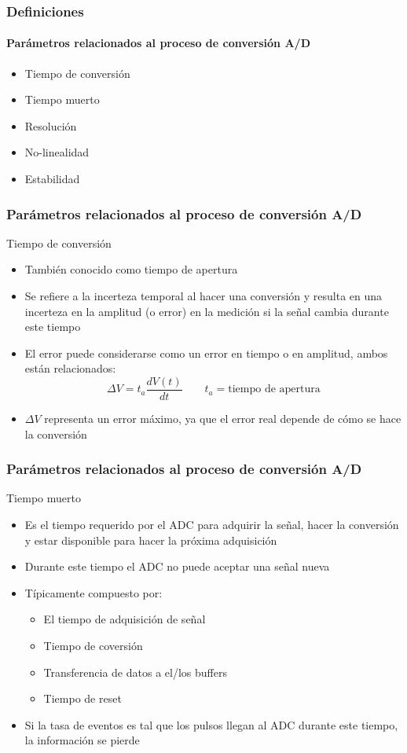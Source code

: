 \documentclass{beamer}
\begin{document}
\begin{frame}
	\frametitle{Definiciones}
	\framesubtitle{Parámetros relacionados al proceso de conversión A/D}
    	\begin{itemize}
      	\item Tiempo de conversión
      	\item Tiempo muerto
      	\item Resolución
      	\item No-linealidad
      	\item Estabilidad
    	\end{itemize}
\end{frame} 

\begin{frame}
\frametitle{Parámetros relacionados al proceso de conversión A/D}
\begin{block}{Tiempo de conversión}
  	\begin{itemize}
    	\item También conocido como \alert{tiempo de apertura}
    	\item \alert{Se refiere a la incerteza temporal al hacer una conversión y
resulta en una incerteza en la amplitud (o error) en la medición si la señal
cambia durante este tiempo}
    	\item El error puede considerarse como un error en tiempo o en amplitud,
ambos están relacionados:
$$\Delta V = t_a \frac{dV(t)}{dt} \qquad t_a = \text{tiempo de apertura}$$
    	\item $\Delta V$ representa un error máximo, ya que el error real depende
de cómo se hace la conversión
  	\end{itemize}

\end{block}
\end{frame} 

\begin{frame}
\frametitle{Parámetros relacionados al proceso de conversión A/D}
\begin{block}{Tiempo muerto}
  	\begin{itemize}
    	\item Es el tiempo requerido por el ADC para {\color{blue} adquirir la
señal, hacer la conversión y estar disponible para hacer la próxima adquisición} 
    	\item Durante este tiempo el ADC no puede aceptar una señal nueva
    	\item Típicamente compuesto por:
  	\begin{itemize}
    	\item El tiempo de adquisición de señal
    	\item Tiempo de coversión
    	\item Transferencia de datos a el/los buffers
    	\item Tiempo de reset
  	\end{itemize}
    	\item Si la tasa de eventos es tal que los pulsos llegan al ADC durante
este tiempo, la información se pierde 
  	\end{itemize}
\end{block}
\end{frame} 
\end{document}
